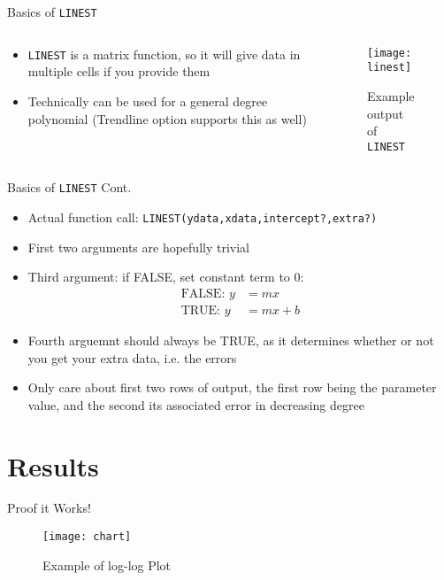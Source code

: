 \documentclass{beamer}
\begin{document}
\begin{frame}{Basics of \texttt{LINEST}}
  \begin{columns}
    \begin{column}{0.5\textwidth}
      \begin{itemize}
      \item \texttt{LINEST} is a matrix function, so it will give data in multiple cells if you provide them
      \item Technically can be used for a general degree polynomial (Trendline option supports this as well)
      \end{itemize}
    \end{column}
    \begin{column}{0.5\textwidth}
      \begin{figure}[H]
        \centering
        \texttt{[image: linest]}
        \caption{Example output of \texttt{LINEST}}
        \label{fig:3}
      \end{figure}
    \end{column}
  \end{columns}
\end{frame}
\begin{frame}{Basics of \texttt{LINEST} Cont.}
  \begin{itemize}
  \item Actual function call: \texttt{LINEST(y\textunderscore data,x\textunderscore data,intercept?,extra?)}
  \item First two arguments are hopefully trivial
  \item Third argument: if FALSE, set constant term to $0$:
    \begin{align*}
      \text{FALSE: }y&=mx\\
      \text{TRUE: }y&=mx+b
    \end{align*}
  \item Fourth arguemnt should always be TRUE, as it determines whether or not you get your extra data, i.e. the errors
  \item Only care about first two rows of output, the first row being the parameter value, and the second its associated error in decreasing degree
  \end{itemize}
\end{frame}

\section{Results}
\begin{frame}{Proof it Works!}
  \begin{figure}[H]
    \centering
    \texttt{[image: chart]}
    \caption{Example of log-log Plot}
    \label{fig:2}
  \end{figure}
\end{frame}
\end{document}
